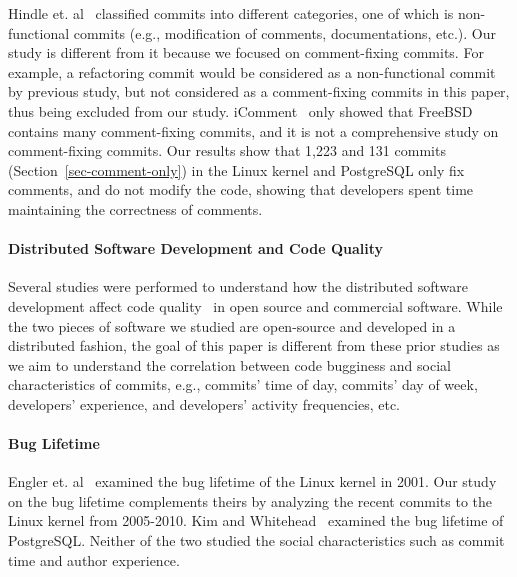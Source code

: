 Hindle et. al~\cite{largeCommits} classified commits into different categories, one of which 
is non-functional commits (e.g., modification of comments, documentations, etc.).
Our study is different from it because we focused on
comment-fixing commits. For example, a refactoring commit 
would be considered as a non-functional commit by previous study, but not considered as a comment-fixing commits in this paper, 
thus being excluded from our study. 
iComment~\cite{iComment} only showed that FreeBSD contains many comment-fixing commits, and it is 
not a comprehensive study on comment-fixing commits.  
Our results show that 1,223 and 131 commits (Section~\ref{sec-comment-only}) %
in the Linux kernel and PostgreSQL only fix comments, and do not modify the code, showing
that developers spent time maintaining the correctness of comments. 


\paragraph{Distributed Software Development and Code Quality}
Several studies were performed to understand how the distributed software development affect 
code quality~\cite{distributed09, organizational08, global06} in open source and commercial 
software. While the two pieces of software we studied are open-source and developed in a distributed fashion,  
the goal of this paper is different from these prior studies as we aim to understand the correlation
between code bugginess and social characteristics of commits, e.g., commits' time of day, commits' day 
of week, developers' experience, and developers' activity frequencies, etc. 

\paragraph{Bug Lifetime}
Engler et. al~\cite{deviant} examined the bug lifetime of the Linux kernel in 2001. 
Our study on the bug lifetime complements theirs by analyzing the recent commits to the Linux kernel from 2005-2010.
Kim and Whitehead~\cite{2006-long} examined the bug lifetime of PostgreSQL.
Neither of the two studied the social characteristics such as commit time and author
experience. 



